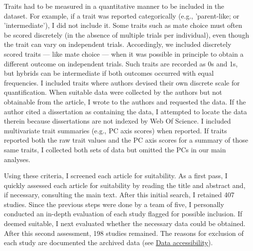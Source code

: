 \documentclass[times, twoside, watermark]{zHenriquesLab-StyleBioRxiv}
\begin{document}
Traits had to be measured in a quantitative manner to be included in the dataset. For example, if a trait was reported categorically (e.g., 'parent-like; or 'intermediate'), I did not include it. Some traits such as mate choice must often be scored discretely (in the absence of multiple trials per individual), even though the trait can vary on independent trials. Accordingly, we included discretely scored traits --- like mate choice --- when it was possible in principle to obtain a different outcome on independent trials. Such traits are recorded as 0s and 1s, but hybrids can be intermediate if both outcomes occurred with equal frequencies. I included traits where authors devised their own discrete scale for quantification. When suitable data were collected by the authors but not obtainable from the article, I wrote to the authors and requested the data. If the author cited a dissertation as containing the data, I attempted to locate the data therein because dissertations are not indexed by Web Of Science. I included multivariate trait summaries (e.g., PC axis scores) when reported. If traits reported both the raw trait values and the PC axis scores for a summary of those same traits, I collected both sets of data but omitted the PCs in our main analyses.\par

Using these criteria, I screened each article for suitability. As a first pass, I quickly assessed each article for suitability by reading the title and abstract and, if necessary, consulting the main text. After this initial search, I retained 407 studies. Since the previous steps were done by a team of five, I personally conducted an in-depth evaluation of each study flagged for possible inclusion. If deemed suitable, I next evaluated whether the necessary data could be obtained. After this second assessment, 198 studies remained. The reasons for exclusion of each study are documented the archived data (see \hyperlink{dataacc}{Data accessibility}). \par
\end{document}
